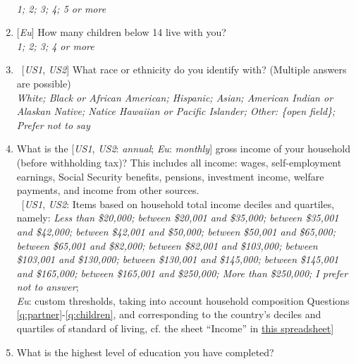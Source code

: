 \begin{enumerate}
\\ \textit{1; 2; 3; 4; 5 or more}
\item \label{q:children} [\textit{Eu}] How many children below 14 live with you?
\\ \textit{1; 2; 3; 4 or more}
\item ~[\textit{US1}, \textit{US2}] What race or ethnicity do you identify with? (Multiple answers are possible) 
\\ \textit{White; Black or African American; Hispanic; Asian; American Indian or Alaskan Native; Natice Hawaiian or Pacific Islander; Other: \{open field\}; Prefer not to say}
\item What is the [\textit{US1}, \textit{US2}: \textit{annual}; \textit{Eu}: \textit{monthly}] gross income of your household (before withholding tax)? This includes all income: wages, self-employment earnings, Social Security benefits, pensions, investment income, welfare payments, and income from other sources. %
\\ ~[\textit{US1}, \textit{US2}: Items based on household total income deciles and quartiles, namely: \textit{Less than \$20,000; between \$20,001 and \$35,000; between \$35,001 and \$42,000; between \$42,001 and \$50,000; between \$50,001 and \$65,000; between \$65,001 and \$82,000; between \$82,001 and \$103,000; between \$103,001 and \$130,000; between \$130,001 and \$145,000; between \$145,001 and \$165,000; between \$165,001 and \$250,000; More than \$250,000; I prefer not to answer}; \\ \textit{Eu}: custom thresholds, taking into account household composition Questions \ref{q:partner}-\ref{q:children}, and corresponding to the country's deciles and quartiles of standard of living, cf. the sheet ``Income'' in \href{https://github.com/bixiou/international_attitudes_toward_global_policies/raw/main/questionnaire/specificities.xlsx}{this spreadsheet}]
\item What is the highest level of education you have completed? 

\end{enumerate}
